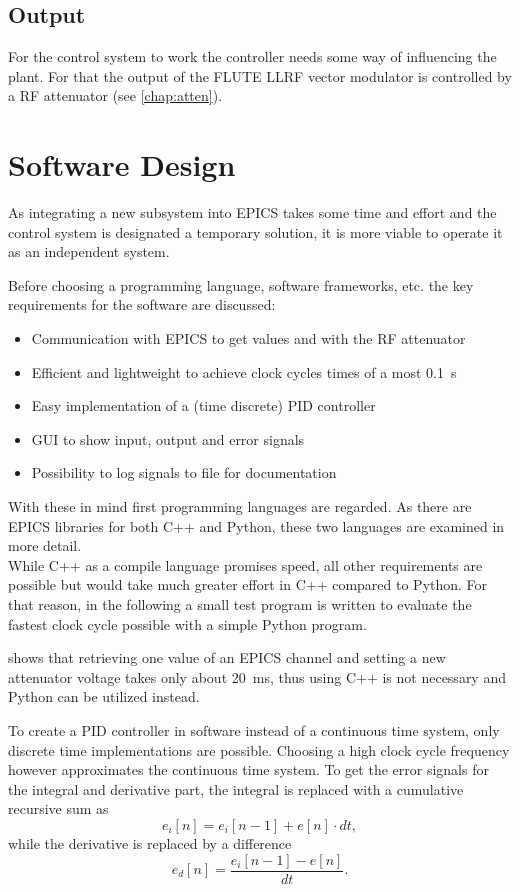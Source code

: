 \subsection{Output}
For the control system to work the controller needs some way of influencing the plant. For that the output of the FLUTE LLRF vector modulator is controlled by a RF attenuator (see \autoref{chap:atten}).

\section{Software Design}
As integrating a new subsystem into EPICS takes some time and effort and the control system is designated a temporary solution, it is more viable to operate it as an independent system.

Before choosing a programming language, software frameworks, etc. the key requirements for the software are discussed:
\begin{itemize}
\item Communication with EPICS to get values and with the RF attenuator
\item Efficient and lightweight to achieve clock cycles times of a most \SI{0.1}{\second}
\item Easy implementation of a (time discrete) PID controller
\item GUI to show input, output and error signals
\item Possibility to log signals to file for documentation
\end{itemize}

With these in mind first programming languages are regarded. As there are EPICS libraries for both C++ and Python, these two languages are examined in more detail.\\
While C++ as a compile language promises speed, all other requirements are possible but would take much greater effort in C++ compared to Python. For that reason, in the following a small test program is written to evaluate the fastest clock cycle possible with a simple Python program.

 shows that retrieving one value of an EPICS channel and setting a new attenuator voltage takes only about \SI{20}{\milli\second}, thus using C++ is not necessary and Python can be utilized instead.
 
To create a PID controller in software instead of a continuous time system, only discrete time implementations are possible. Choosing a high clock cycle frequency however approximates the continuous time system. To get the error signals for the integral and derivative part, the integral is replaced with a cumulative recursive sum as
\begin{equation}
e_i[n]=e_i[n-1]+e[n] \cdot dt,
\end{equation}
while the derivative is replaced by a difference
\begin{equation}
e_d[n]=\frac{e_i[n-1]-e[n]}{dt}.
\end{equation}

